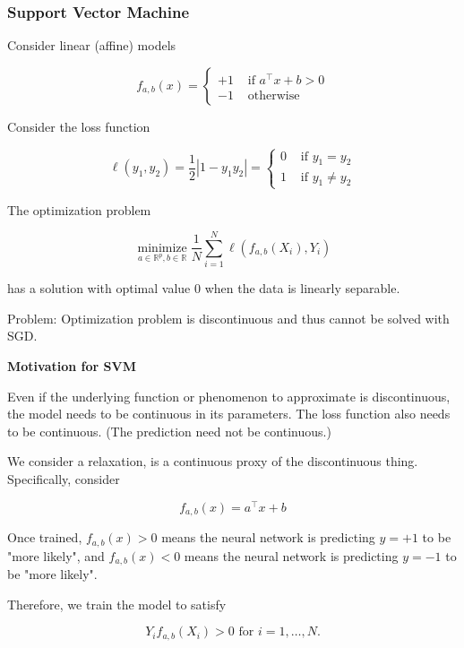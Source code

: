 \subsubsection{Support Vector Machine   }


\begin{frame}[allowframebreaks]

Consider linear (affine) models

$$
f_{a, b}(x)= \begin{cases}+1 & \text { if } a^{\top} x+b>0 \\ -1 & \text { otherwise }\end{cases}
$$

Consider the loss function

$$
\ell\left(y_{1}, y_{2}\right)=\frac{1}{2}\left|1-y_{1} y_{2}\right|= \begin{cases}0 & \text { if } y_{1}=y_{2} \\ 1 & \text { if } y_{1} \neq y_{2}\end{cases}
$$

The optimization problem

$$
\underset{a \in \mathbb{R}^{p}, b \in \mathbb{R}}{\operatorname{minimize}} \frac{1}{N} \sum_{i=1}^{N} \ell\left(f_{a, b}\left(X_{i}\right), Y_{i}\right)
$$

has a solution with optimal value 0 when the data is linearly separable.

Problem: Optimization problem is discontinuous and thus cannot be solved with SGD.

\par\noindent\textcolor{gray}{\hdashrule{\textwidth}{0.4pt}{1pt 2pt}}

\textbf{Motivation for SVM}

Even if the underlying function or phenomenon to approximate is discontinuous, the model needs to be continuous in its parameters. The loss function also needs to be continuous. (The prediction need not be continuous.)

We consider a relaxation, is a continuous proxy of the discontinuous thing. Specifically, consider

$$
f_{a, b}(x)=a^{\top} x+b
$$

Once trained, $f_{a, b}(x)>0$ means the neural network is predicting $y=+1$ to be "more likely", and $f_{a, b}(x)<0$ means the neural network is predicting $y=-1$ to be "more likely".

Therefore, we train the model to satisfy

$$
Y_{i} f_{a, b}\left(X_{i}\right)>0 \text { for } i=1, \ldots, N .
$$


\end{frame}
